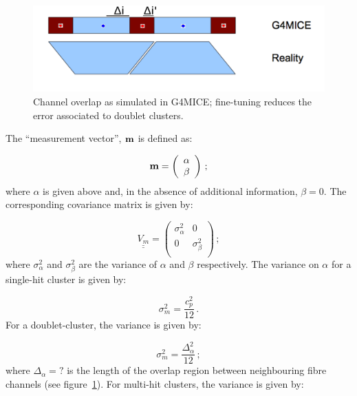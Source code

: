 \begin{figure}
  \begin{center}
    \includegraphics[width=0.9\linewidth]{detectors/tracker/04-Reconstruction/04-01-Hits-and-clusters/Figures/clusterRES.pdf}
  \end{center}
  \caption{Channel overlap as simulated in G4MICE; fine-tuning reduces the error associated to doublet clusters.} 
  \label{Fig:Clust}
\end{figure}
The ``measurement vector'', ${\bf m}$ is defined as:

\begin{equation}
  {\bf m} =  \left( 
               \begin{array}{c}
                 \alpha \\ \beta
               \end{array}
              \right) \, ;
\end{equation}
where $\alpha$ is given above and, in the absence of additional information, $\beta = 0$. The corresponding covariance matrix is given by:

\begin{equation}
  \underline{\underline{V_m}} = 
    \left( 
      \begin{array}{cc}
         \sigma^2_\alpha & 0         \\
         0          & \sigma^2_\beta \\
       \end{array}
     \right) \, ;
\end{equation}
where $\sigma^2_\alpha$ and $\sigma^2_\beta$ are the variance of $\alpha$ and $\beta$ respectively. The variance on $\alpha$ for a single-hit cluster is given by:

\begin{equation}
  \sigma^2_m = \frac{c^2_p}{12} \, .
\end{equation}
For a doublet-cluster, the variance is given by:

\begin{equation}
  \sigma^2_m = \frac{\Delta^2_\alpha}{12} \, ;
\end{equation}
where $\Delta_\alpha = ?$ is the length of the overlap region between neighbouring fibre channels (see figure~\ref{Fig:Clust}). For multi-hit clusters, the variance is given by:

